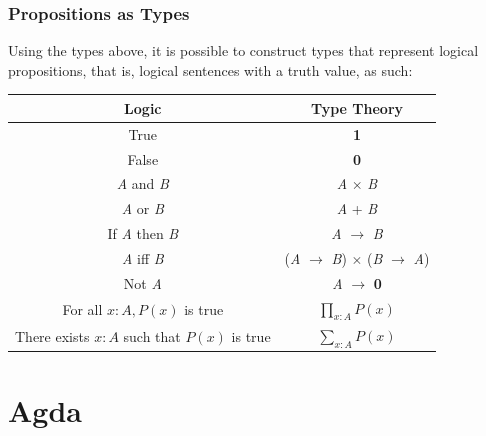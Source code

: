 \documentclass[12pt]{report}
\begin{document}
\subsection*{Propositions as Types}
Using the types above, it is possible to construct types that represent logical propositions, that is, logical sentences with a truth value, as such:
\begin{center}
\begin{tabular}{|c|c|}
\hline 
\textbf{Logic} & \textbf{Type Theory} \\ 
\hline
True & \textbf{1} \\ 

False & \textbf{0} \\ 

\textit{A} and \textit{B} & \textit{A} $\times$ \textit{B} \\ 

\textit{A} or \textit{B} & \textit{A} + \textit{B} \\ 

If \textit{A} then \textit{B} & \textit{A} $ \rightarrow $ \textit{B} \\  

\textit{A} iff \textit{B} & (\textit{A} $ \rightarrow $ \textit{B}) $\times$ (\textit{B} $\rightarrow$ \textit{A})  \\ 

Not \textit{A} & \textit{A} $ \rightarrow $ \textbf{0} \\ 

For all $ x : A, P(x)$ is true & $\prod_{x : A}P(x)$\\

There exists $ x : A$ such that $P(x)$ is true & $\sum_{x : A}P(x)$\\

\hline 
\end{tabular} 
\end{center} 

\chapter{Agda}
\end{document}
